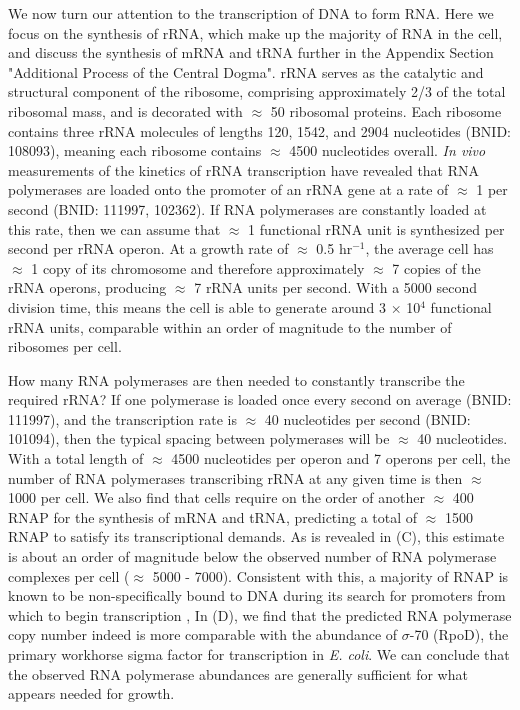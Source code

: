 We now turn our attention to the transcription of DNA to form RNA. Here we focus
on the synthesis of rRNA, which make up the majority of RNA in the cell, and
discuss the synthesis of mRNA and tRNA further in the Appendix Section
"Additional Process of the Central Dogma". rRNA serves as the catalytic and
structural component of the ribosome, comprising approximately 2/3 of the total
ribosomal mass, and is decorated with $\approx$ 50 ribosomal proteins. Each
ribosome contains three rRNA molecules of lengths 120, 1542, and 2904
nucleotides (BNID: 108093), meaning each ribosome contains $\approx$ 4500
nucleotides overall. \textit{In vivo} measurements of the kinetics of rRNA
transcription have revealed that RNA polymerases are loaded onto the promoter of
an rRNA gene at a rate of $\approx$ 1 per second (BNID: 111997, 102362). If RNA
polymerases are constantly loaded at this rate, then we can assume that
$\approx$ 1 functional rRNA unit is synthesized per second per rRNA operon.  At
a growth rate of $\approx$ 0.5 hr$^{-1}$, the average cell has $\approx$ 1 copy
of its chromosome and therefore approximately $\approx$ 7 copies of the rRNA
operons, producing $\approx$ 7 rRNA units per second. With a 5000 second
division time, this means the cell is able to generate around 3 $\times$ 10$^4$
functional rRNA units, comparable within an order of magnitude to the number of
ribosomes per cell.

How many RNA polymerases are then needed to constantly transcribe the required
rRNA? If one polymerase is loaded once every second on average (BNID: 111997),
and the transcription rate is $\approx$ 40 nucleotides per second (BNID:
101094), then the typical spacing between polymerases will be $\approx$ 40
nucleotides. With a total length of $\approx$ 4500 nucleotides per operon and 7
operons per cell, the number of RNA polymerases transcribing rRNA at any given
time is then $\approx$ 1000 per cell. We also find that cells require on the
order of another $\approx$ 400 RNAP for the  synthesis of mRNA and tRNA,
predicting a total of  $\approx$ 1500 RNAP to satisfy its transcriptional
demands. As is revealed in (C), this estimate is about an
order of magnitude below the observed number of RNA polymerase complexes per
cell ($\approx$ 5000 - 7000). Consistent with this, a majority of RNAP is known
to be  non-specifically bound to DNA during its search for promoters from which
to begin transcription \citep{klumpp2008, patrick2015},  In
(D), we find that the predicted RNA polymerase copy number
indeed is more comparable with the abundance of $\sigma$-70 (RpoD), the primary
workhorse sigma factor for transcription in \textit{E. coli}. We can conclude
that the observed RNA polymerase abundances are generally sufficient for what
appears needed for growth.

